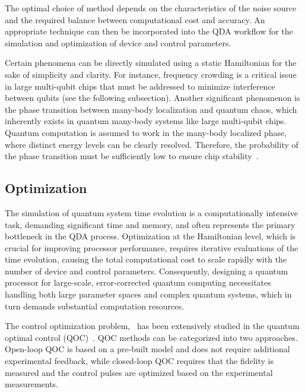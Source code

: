 \documentclass[a4paper,onecolumn,11pt,unpublished]{quantumarticle}
\begin{document}
The optimal choice of method depends on the characteristics of the noise source and the required balance between computational cost and accuracy. An appropriate technique can then be incorporated into the QDA workflow for the simulation and optimization of device and control parameters.

Certain phenomena can be directly simulated using a static Hamiltonian for the sake of simplicity and clarity. For instance, frequency crowding is a critical issue in large multi-qubit chips that must be addressed to minimize interference between qubits (see the following subsection). Another significant phenomenon is the phase transition between many-body localization and quantum chaos, which inherently exists in quantum many-body systems like large multi-qubit chips. Quantum computation is assumed to work in the many-body localized phase, where distinct energy levels can be clearly resolved. Therefore, the probability of the phase transition must be sufficiently low to ensure chip stability~\cite{Varvelis2024Perturbative,Berke2022Transmon}.

\subsection{Optimization \label{sec:control_optimization}}
The simulation of quantum system time evolution is a computationally intensive task, demanding significant time and memory, and often represents the primary bottleneck in the QDA process.  Optimization at the Hamiltonian level, which is crucial for improving processor performance, requires iterative evaluations of the time evolution, causing the total computational cost to scale rapidly with the number of device and control parameters. Consequently, designing a quantum processor for large-scale, error-corrected quantum computing necessitates handling both large parameter spaces and complex quantum systems, which in turn demands substantial computation resources.

The control optimization problem,~ has been extensively studied in the quantum optimal control (QOC)~\cite{Werschnik2007Quantum,Skinner2012Optimal,Koch2022Quantum,Rembold2020Introduction,Wilhelm2020An}. QOC methods can be categorized into two approaches. Open-loop QOC is based on a pre-built model and does not require additional experimental feedback, while closed-loop QOC requires that the fidelity is measured and the control pulses are optimized based on the experimental measurements.
\end{document}
